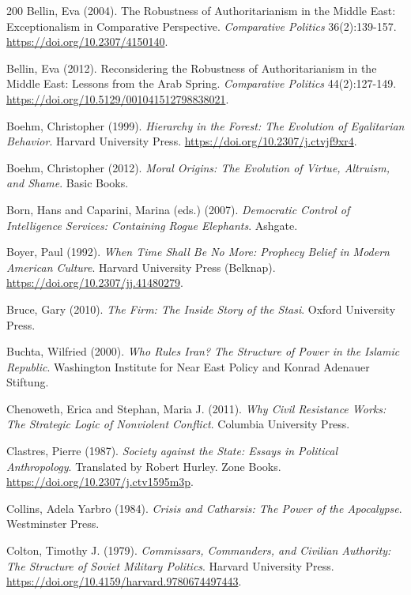 \documentclass[11pt,letterpaper]{article}
\theoremstyle{definition}
\theoremstyle{remark}
\begin{document}
\begin{thebibliography}{200}
Bellin, Eva (2004). The Robustness of Authoritarianism in the Middle East: Exceptionalism in Comparative Perspective. \emph{Comparative Politics} 36(2):139-157. \url{https://doi.org/10.2307/4150140}.

Bellin, Eva (2012). Reconsidering the Robustness of Authoritarianism in the Middle East: Lessons from the Arab Spring. \emph{Comparative Politics} 44(2):127-149. \url{https://doi.org/10.5129/001041512798838021}.

Boehm, Christopher (1999). \emph{Hierarchy in the Forest: The Evolution of Egalitarian Behavior}. Harvard University Press. \url{https://doi.org/10.2307/j.ctvjf9xr4}.

Boehm, Christopher (2012). \emph{Moral Origins: The Evolution of Virtue, Altruism, and Shame}. Basic Books.

Born, Hans and Caparini, Marina (eds.) (2007). \emph{Democratic Control of Intelligence Services: Containing Rogue Elephants}. Ashgate.

Boyer, Paul (1992). \emph{When Time Shall Be No More: Prophecy Belief in Modern American Culture}. Harvard University Press (Belknap). \url{https://doi.org/10.2307/jj.41480279}.

Bruce, Gary (2010). \emph{The Firm: The Inside Story of the Stasi}. Oxford University Press.

Buchta, Wilfried (2000). \emph{Who Rules Iran? The Structure of Power in the Islamic Republic}. Washington Institute for Near East Policy and Konrad Adenauer Stiftung.

Chenoweth, Erica and Stephan, Maria J. (2011). \emph{Why Civil Resistance Works: The Strategic Logic of Nonviolent Conflict}. Columbia University Press.

Clastres, Pierre (1987). \emph{Society against the State: Essays in Political Anthropology}. Translated by Robert Hurley. Zone Books. \url{https://doi.org/10.2307/j.ctv1595m3p}.

Collins, Adela Yarbro (1984). \emph{Crisis and Catharsis: The Power of the Apocalypse}. Westminster Press.

Colton, Timothy J. (1979). \emph{Commissars, Commanders, and Civilian Authority: The Structure of Soviet Military Politics}. Harvard University Press. \url{https://doi.org/10.4159/harvard.9780674497443}.


\end{thebibliography}
\end{document}
